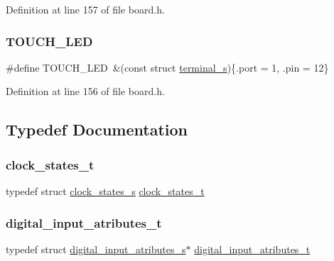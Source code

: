 Definition at line 157 of file board.\+h.

\mbox{\label{group__hal_ga11baf524276151957e8037eaed95b162}} 
\subsubsection{\texorpdfstring{T\+O\+U\+C\+H\+\_\+\+L\+ED}{TOUCH\_LED}}
{\footnotesize\ttfamily \#define T\+O\+U\+C\+H\+\_\+\+L\+ED~\&(const struct \hyperlink{structterminal__s}{terminal\+\_\+s})\{.port = 1, .pin = 12\}}



Definition at line 156 of file board.\+h.



\subsection{Typedef Documentation}
\mbox{\label{group__hal_gaae8d32ee89693684379856530d8a1241}} 
\subsubsection{\texorpdfstring{clock\+\_\+states\+\_\+t}{clock\_states\_t}}
{\footnotesize\ttfamily typedef struct \hyperlink{structclock__states__s}{clock\+\_\+states\+\_\+s}  \hyperlink{group__hal_gaae8d32ee89693684379856530d8a1241}{clock\+\_\+states\+\_\+t}}

\mbox{\label{group__hal_ga425db4b2c52be0608edec9a314976335}} 
\subsubsection{\texorpdfstring{digital\+\_\+input\+\_\+atributes\+\_\+t}{digital\_input\_atributes\_t}}
{\footnotesize\ttfamily typedef struct \hyperlink{structdigital__input__atributes__s}{digital\+\_\+input\+\_\+atributes\+\_\+s}$\ast$  \hyperlink{group__hal_ga425db4b2c52be0608edec9a314976335}{digital\+\_\+input\+\_\+atributes\+\_\+t}}

